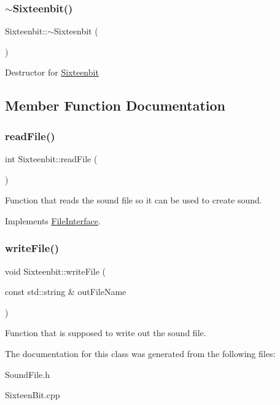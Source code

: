 \subsubsection{\texorpdfstring{$\sim$\+Sixteenbit()}{~Sixteenbit()}}
{\footnotesize\ttfamily Sixteenbit\+::$\sim$\+Sixteenbit (\begin{DoxyParamCaption}{ }\end{DoxyParamCaption})}

Destructor for \hyperlink{classSixteenbit}{Sixteenbit} 

\subsection{Member Function Documentation}
\mbox{\label{classSixteenbit_ab34f06b23dabdf172f1c0990c5648ff1}} 
\subsubsection{\texorpdfstring{read\+File()}{readFile()}}
{\footnotesize\ttfamily int Sixteenbit\+::read\+File (\begin{DoxyParamCaption}{ }\end{DoxyParamCaption})\hspace{0.3cm}{\ttfamily [virtual]}}

Function that reads the sound file so it can be used to create sound. 

Implements \hyperlink{classFileInterface}{File\+Interface}.

\mbox{\label{classSixteenbit_adcc83bd652c4b4732b89e59557e1e5a8}} 
\subsubsection{\texorpdfstring{write\+File()}{writeFile()}}
{\footnotesize\ttfamily void Sixteenbit\+::write\+File (\begin{DoxyParamCaption}\item[{const std\+::string \&}]{out\+File\+Name }\end{DoxyParamCaption})}

Function that is supposed to write out the sound file. 

The documentation for this class was generated from the following files\+:\begin{DoxyCompactItemize}
\item 
Sound\+File.\+h\item 
Sixteen\+Bit.\+cpp\end{DoxyCompactItemize}
